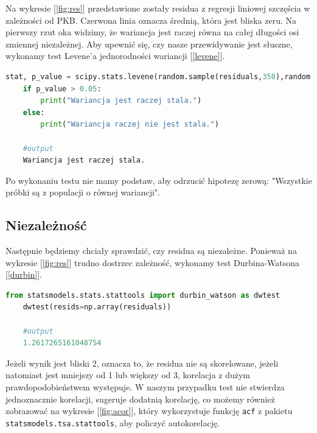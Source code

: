 \documentclass{article}
\theoremstyle{break}
\newcommand{\code}[1]{\colorbox{light-gray}{\texttt{#1}}}
\begin{document}
Na wykresie [\ref{fig:res}] przedstawione zostały residua z regresji liniowej szczęścia w zależności od PKB. Czerwona linia oznacza średnią, która jest bliska zeru. Na pierwszy rzut oka widzimy, że wariancja jest raczej równa na całej długości osi zmiennej niezależnej. Aby upewnić się, czy nasze przewidywanie jest słuszne, wykonamy test Levene'a jednorodności wariancji [\ref{levene}]. 

\begin{lstlisting}[language=Python, caption=Test Levene'a, label={levene}]
	stat, p_value = scipy.stats.levene(random.sample(residuals,350),random.sample(residuals,350))
	if p_value > 0.05:
		print("Wariancja jest raczej stala.")
	else:
		print("Wariancja raczej nie jest stala.")
		
	#output
	Wariancja jest raczej stala.
\end{lstlisting}

Po wykonaniu testu nie mamy podstaw, aby odrzucić hipotezę zerową: "Wszystkie próbki są z populacji o równej wariancji". 

\subsection{Niezależność}

Następnie będziemy chciały sprawdzić, czy residua są niezależne. Ponieważ na wykresie [\ref{fig:res}] trudno dostrzec zależność, wykonamy test Durbina-Watsona [\ref{durbin}].

\begin{lstlisting}[language=Python, caption=Test Durbina-Watsona, label={durbin}]
	from statsmodels.stats.stattools import durbin_watson as dwtest
	dwtest(resids=np.array(residuals))
	
	#output
	1.2617265161048754
\end{lstlisting}

Jeżeli wynik jest bliski 2, oznacza to, że residua nie są skorelowane, jeżeli natomiast jest mniejszy od 1 lub większy od 3, korelacja z dużym prawdopodobieństwem występuje. W naszym przypadku test nie stwierdza jednoznacznie korelacji, sugeruje dodatnią korelację, co możemy również zobrazować na wykresie [\ref{fig:acor}], który wykorzystuje funkcję \code{acf} z pakietu \code{statsmodels.tsa.stattools}, aby policzyć autokorelację.
\end{document}
